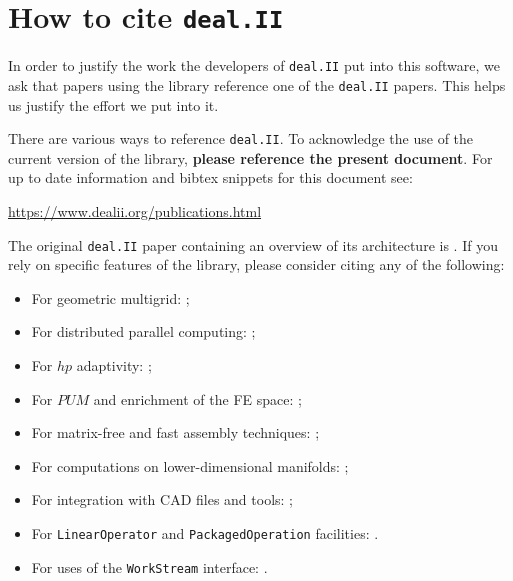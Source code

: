 \documentclass{ansarticle-preprint}
\newcommand{\specialword}[1]{\texttt{#1}}
\newcommand{\dealii}{{\specialword{deal.II}}}
\begin{document}
\section{How to cite \dealii{}}\label{sec:cite}

In order to justify the work the developers of \dealii{} put into this
software, we ask that papers using the library reference one of the
\dealii{} papers. This helps us justify the effort we put into it.

There are various ways to reference \dealii{}. To acknowledge the use of the
current version of the library, \textbf{please reference the present document}. For up
to date information and bibtex snippets for this document see:
\begin{center}
 \url{https://www.dealii.org/publications.html}
\end{center}


The original \texttt{\dealii{}} paper containing an overview of its
architecture is \cite{BangerthHartmannKanschat2007}. If you rely on specific
features of the library, please consider citing any of the following:
\begin{itemize}
 \item For geometric multigrid: \cite{Kanschat2004,JanssenKanschat2011};
 \item For distributed parallel computing: \cite{BangerthBursteddeHeisterKronbichler11};
 \item For $hp$ adaptivity: \cite{BangerthKayserHerold2007};
  \item For $PUM$ and enrichment of the FE space: \cite{Davydov2016};
 \item For matrix-free and fast assembly techniques:
   \cite{KronbichlerKormann2012};
 \item For computations on lower-dimensional manifolds:
   \cite{DeSimoneHeltaiManigrasso2009};
 \item For integration with CAD files and tools:
   \cite{HeltaiMola2015};
 \item For \texttt{LinearOperator} and \texttt{PackagedOperation} facilities:
   \cite{MaierBardelloniHeltai-2016-a,MaierBardelloniHeltai-2016-b}.
 \item For uses of the \texttt{WorkStream} interface:
   \cite{TKB16}.
\end{itemize}
\end{document}
